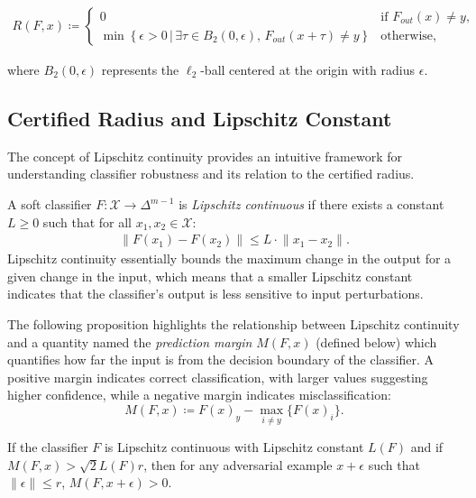 \begin{align*}
    R(F,x) \coloneqq
    \begin{cases}
        0 & \text{if } F_{out}(x) \neq y, \\[2ex]
        \min \left\{ \epsilon > 0 \,|\, \exists \tau \in B_2(0,\epsilon),\, F_{out}(x + \tau) \neq y \right\} & \text{otherwise,}
    \end{cases}
\end{align*}

where $B_2(0,\epsilon)$ represents the $\ell_2$-ball centered at the origin with radius $\epsilon$.

\subsection{Certified Radius and Lipschitz Constant}\label{subsec:certified-radius-and-lipschitz-constant}

The concept of Lipschitz continuity provides an intuitive framework for understanding classifier robustness and its relation to the certified radius.

A soft classifier $F: \mathcal{X} \rightarrow \Delta^{m-1}$ is \textit{Lipschitz continuous} if there exists a constant $L \geq 0$ such that for all $x_1, x_2 \in \mathcal{X}$:
\begin{align*}
    \lVert F(x_1)- F(x_2) \rVert \leq L \cdot \lVert  x_1- x_2\rVert.
\end{align*}
Lipschitz continuity essentially bounds the maximum change in the output for a given change in the input, which means that a smaller Lipschitz constant indicates that the classifier's output is less sensitive to input perturbations.

The following proposition highlights the relationship between Lipschitz continuity and a quantity named the \textit{prediction margin} $M(F,x)$ (defined below) which quantifies how far the input is from the decision boundary of the classifier.
A positive margin indicates correct classification, with larger values suggesting higher confidence, while a negative margin indicates misclassification:
\begin{equation}
    M(F,x) \coloneqq F(x)_{y} - \max_{i \neq y}\{F(x)_i\}.\label{eq:prediction-margin}
\end{equation}
\begin{proposition}
    If the classifier $F$ is Lipschitz continuous with Lipschitz constant $L(F)$ and if $M(F,x)>\sqrt{2}L(F)r$, then for any adversarial example $x+\epsilon$ such that $\lVert \epsilon \rVert\leq r$, $M(F,x+\epsilon)>0$.
\end{proposition}

